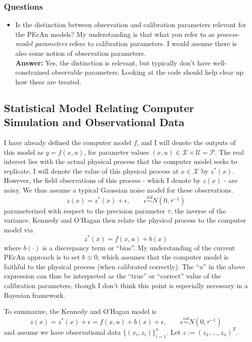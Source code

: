 \documentclass[12pt]{article}
\begin{document}
\subsubsection{Questions}
\begin{itemize}
\item Is the distinction between observation and calibration parameters relevant for the PEcAn models? My understanding is that what you refer to as \textit{process-model parameters}
refers to calibration parameters. I would assume there is also some notion of observation parameters. \\
\textbf{Answer: } Yes, the distinction is relevant, but typically don't have well-constrained observable parameters. Looking at the code should help clear up how these are treated. 
\end{itemize}

\subsection{Statistical Model Relating Computer Simulation and Observational Data}
I have already defined the computer model $f$, and I will denote the outputs of this model as $y = f(x, u)$, for parameter values $(x, u) \in \mathcal{X} \times \mathcal{U} = \mathcal{P}$.
The real interest lies with the actual physical process that the computer model seeks to replicate. I will denote the value of this physical process at $x \in \mathcal{X}$ by $z^*(x)$. 
However, the field observations of this process - which I denote by $z(x)$ - are noisy. We thus assume a typical Gaussian noise model for these observations. 
\[z(x) = z^*(x) + \epsilon, \qquad \epsilon \overset{iid}{\sim} N(0, \tau^{-1})\]  
parameterized with respect to the precision parameter $\tau$, the inverse of the variance. Kennedy and O'Hagan then relate the physical process to the computer model via 
\[z^*(x) = f(x, u) + b(x)\]
where $b(\cdot)$ is a discrepancy term or ``bias''. My understanding of the current PEcAn approach is to set $b \equiv 0$, which assumes that the computer model is faithful to the physical
process (when calibrated correctly). The ``$u$'' in the above expression can thus be interpreted as the ``true'' or ``correct''  value of the calibration parameters, though I don't think this 
point is especially necessary in a Bayesian framework. 

To summarize, the Kennedy and O'Hagan model is 
\[z(x) = z^*(x) + \epsilon = f(x, u) + b(x) + \epsilon, \qquad \epsilon \overset{iid}{\sim} N(0, \tau^{-1})\] 
and assume we have observational data $\{(x_i, z_i)\}_{i = 1}^{n}$. Let $z := (z_1, \dots, z_n)^T$. 
\end{document}
